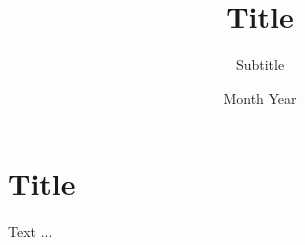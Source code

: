 \documentclass{enisareport}
\title{ Title }
\subtitle{ Subtitle }
\date{ Month Year }
\begin{document}
\maketitle


\chapter{Title}

Text ...


%  

\end{document}

